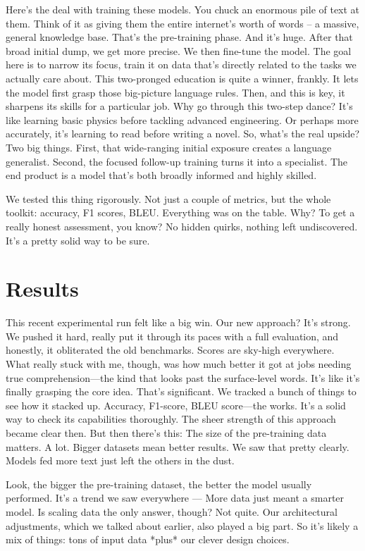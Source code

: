 \documentclass{article}
\begin{document}
Here’s the deal with training these models. You chuck an enormous pile of text at them. Think of it as giving them the entire internet’s worth of words – a massive, general knowledge base. That’s the pre-training phase. And it's huge. After that broad initial dump, we get more precise. We then fine-tune the model. The goal here is to narrow its focus, train it on data that’s directly related to the tasks we actually care about. This two-pronged education is quite a winner, frankly. It lets the model first grasp those big-picture language rules. Then, and this is key, it sharpens its skills for a particular job. Why go through this two-step dance? It’s like learning basic physics before tackling advanced engineering. Or perhaps more accurately, it’s learning to read before writing a novel. So, what’s the real upside? Two big things. First, that wide-ranging initial exposure creates a language generalist. Second, the focused follow-up training turns it into a specialist. The end product is a model that's both broadly informed and highly skilled.

We tested this thing rigorously. Not just a couple of metrics, but the whole toolkit: accuracy, F1 scores, BLEU. Everything was on the table. Why? To get a really honest assessment, you know? No hidden quirks, nothing left undiscovered. It’s a pretty solid way to be sure.

\section{Results}

This recent experimental run felt like a big win. Our new approach? It’s strong. We pushed it hard, really put it through its paces with a full evaluation, and honestly, it obliterated the old benchmarks. Scores are sky-high everywhere. What really stuck with me, though, was how much better it got at jobs needing true comprehension—the kind that looks past the surface-level words. It’s like it’s finally grasping the core idea. That's significant. We tracked a bunch of things to see how it stacked up. Accuracy, F1-score, BLEU score—the works. It’s a solid way to check its capabilities thoroughly. The sheer strength of this approach became clear then. But then there's this: The size of the pre-training data matters. A lot. Bigger datasets mean better results. We saw that pretty clearly. Models fed more text just left the others in the dust.

Look, the bigger the pre-training dataset, the better the model usually performed. It’s a trend we saw everywhere — More data just meant a smarter model. Is scaling data the only answer, though? Not quite. Our architectural adjustments, which we talked about earlier, also played a big part. So it’s likely a mix of things: tons of input data *plus* our clever design choices.
\end{document}
